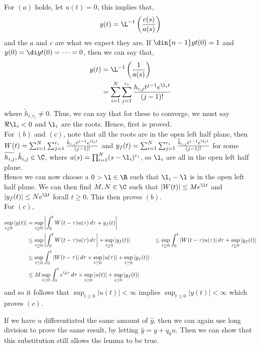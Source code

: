 For $(a)$ holds, let $u(t) = 0$, this implies that,
$$ y(t) = \L^{-1}\left( \frac{c(s)}{a(s)}\right) $$
and the $a$ and $c$ are what we expect they are. If $\din {n-1} y t (0) = 1$ and $y(0) = \di y t (0) = \dots = 0$, then we can say that,
\begin{align*}
  y(t) &= \L^{-1}\left(\frac{1}{a(s)}\right)\\
  &= \sum_{i=1}^N \sum_{j = 1}^{r_i} \frac{h_{i,j}t^{j-1}e^{\l_i t}}{(j - 1)!}
\end{align*}
where $\widetilde{h}_{i, r_i} \ne 0$. Thus, we can say that for these to converge, we must say $\Re \l_i < 0$ and $\l_i$ are the roots. Hence, first is proved.\\
For $(b)$ and $(c)$, note that all the roots are in the open left half plane, then $W(t) = \sum_{i=1}^N \sum_{j=1}^{r_i} \frac{\hat{h}_{i, j}t^{j-1}e^{\l_i t}}{(j - 1)!}$ and $y_f (t) = \sum_{i=1}^N \sum_{j=1}^{r_i} \frac{\widetilde{h}_{i, j}t^{j-1}e^{\l_i t}}{(j - 1)!}$ for some $\widetilde{h_{i, j}}, \hat{h}_{i, j} \in \C$, where $a(s) = \prod_{i=1}^N (s - \l_i)^{r_i}$, so $\l_i$ are all in the open left half plane. \\
Hence we can now choose a $0 > \l \in \R$ such that $\l_i - \l$ is in the open left half plane. We can then find $M, N  \in \C$ such that $|W(t)| \le Me^{\l t}$ and $|y_f (t)| \le Ne^{\l t}$ forall $t \ge 0$. This then proves $(b)$. \\

For $(c)$,
\begin{align*}
  \sup_{t \ge 0} |y(t)| &= \sup_{t \ge 0} \left| \int^t_0 W(t - \tau)u(\tau) \,d\tau + y_f(t) \right| \\
  &\le \sup_{t \ge 0} \left| \int^t_0 W(t - \tau)u(\tau) \,d\tau \right|  + \sup_{t \ge 0}| y_f(t) |
  &\le \sup_{t \ge 0} \int^t_0 |W(t - \tau)u(\tau)| \,d\tau  + \sup_{t \ge 0}| y_f(t) | \\
  &\le \sup_{t \ge 0} \int^t_0 |W(t - \tau)|\,d\tau \times \sup_{t\ge 0} |u(\tau)|  + \sup_{t \ge 0}| y_f(t) | \\
  &\le M\sup_{t \ge 0} \int_0^t e^{\l \tau}\,d\tau \times \sup_{t \ge 0} |u(t)| + \sup_{t \ge 0} |y_f (t)|
\end{align*}
and so it follows that $\sup_{t \ge 0} |u(t)| < \infty$ implies $\sup_{t \ge 0} |y(t)| < \infty$ which proves $(c)$.

If we have $u$ differentiated the same amount of $\hat{y}$, then we can again use long division to prove the same result, by letting $\hat y = y + q_0u$. Then we can show that this substitution still allows the lemma to be true.

